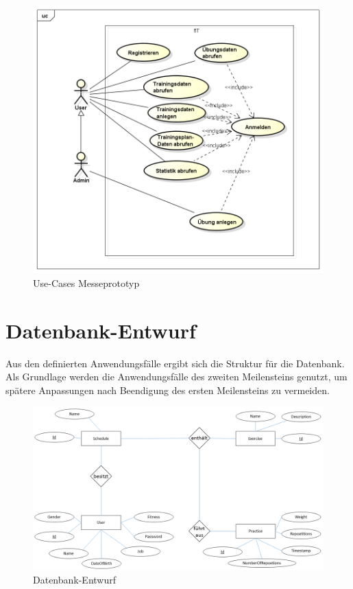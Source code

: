 \begin{figure}[h]
\centering
\includegraphics[width=0.8\linewidth]{content/images/UseCase-Messeprototyp.png}
\caption{Use-Cases Messeprototyp}
\label{pic:usecase-messe}
\end{figure}
\newpage
\section{Datenbank-Entwurf}
\label{sec:Datenbank-Entwurf}
Aus den definierten Anwendungsfälle ergibt sich die Struktur für die Datenbank. Als Grundlage werden die Anwendungsfälle des zweiten Meilensteins genutzt, um spätere Anpassungen nach Beendigung des ersten Meilensteins zu vermeiden.

\begin{figure}[h]
\centering
\includegraphics[width=0.8\linewidth]{content/images/DB-Entwurf.png}
\caption{Datenbank-Entwurf}
\label{pic:usecase-messe}
\end{figure}

